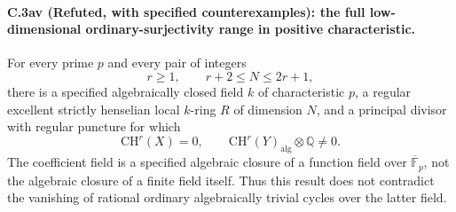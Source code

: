\paragraph{C.3av (Refuted, with specified counterexamples): the full low-dimensional ordinary-surjectivity range in positive characteristic.}
For every prime $p$ and every pair of integers
\[
                   r\ge1,\qquad r+2\le N\le2r+1,
\]
there is a specified algebraically closed field $k$ of characteristic
$p$, a regular excellent strictly henselian local $k$-ring $R$ of
dimension $N$, and a principal divisor with regular puncture for which
\[
 \mathrm{CH}^r(X)=0,
 \qquad \mathrm{CH}^r(Y)_{\mathrm{alg}}\otimes\mathbb Q\ne0.
\]
The coefficient field is a specified algebraic closure of a function
field over $\overline{\mathbb F}_p$, not the algebraic closure of a
finite field itself. Thus this result does not contradict the vanishing
of rational ordinary algebraically trivial cycles over the latter field.

